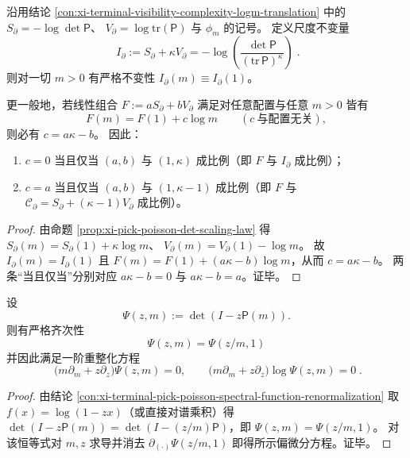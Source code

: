 \begin{conclusion}[尺度不变量与平移型势的规范唯一性]\label{con:xi-terminal-pick-poisson-scale-invariant-and-affine-uniqueness}
沿用结论 \ref{con:xi-terminal-visibility-complexity-logm-translation} 中的
\(
S_{\partial}=-\log\det\mathsf P
\)、
\(
V_{\partial}=\log\mathrm{tr}(\mathsf P)
\)
与 \(\phi_m\) 的记号。
定义尺度不变量
\[
\boxed{\;
I_{\partial}:=S_{\partial}+\kappa V_{\partial}
=-\log\!\left(\frac{\det\mathsf P}{(\mathrm{tr}\,\mathsf P)^{\kappa}}\right)\; } .
\]
则对一切 \(m>0\) 有严格不变性 \(I_{\partial}(m)\equiv I_{\partial}(1)\)。
\par
更一般地，若线性组合 \(F:=aS_{\partial}+bV_{\partial}\) 满足对任意配置与任意 \(m>0\) 皆有
\[
F(m)=F(1)+c\log m\qquad(c\ \text{与配置无关}),
\]
则必有 \(c=a\kappa-b\)。
因此：
\begin{enumerate}
  \item \(c=0\) 当且仅当 \((a,b)\) 与 \((1,\kappa)\) 成比例（即 \(F\) 与 \(I_{\partial}\) 成比例）；
  \item \(c=a\) 当且仅当 \((a,b)\) 与 \((1,\kappa-1)\) 成比例（即 \(F\) 与 \(\mathscr C_{\partial}=S_{\partial}+(\kappa-1)V_{\partial}\) 成比例）。
\end{enumerate}
\end{conclusion}
\begin{proof}
由命题 \ref{prop:xi-pick-poisson-det-scaling-law} 得
\(
S_{\partial}(m)=S_{\partial}(1)+\kappa\log m
\)、
\(
V_{\partial}(m)=V_{\partial}(1)-\log m
\)。
故
\(
I_{\partial}(m)=I_{\partial}(1)
\)
且
\(
F(m)=F(1)+(a\kappa-b)\log m
\)，从而 \(c=a\kappa-b\)。
两条“当且仅当”分别对应 \(a\kappa-b=0\) 与 \(a\kappa-b=a\)。证毕。
\end{proof}

\begin{conclusion}[特征行列式的齐次性与一阶重整化方程]\label{con:xi-terminal-pick-poisson-characteristic-homogeneity-pde}
设
\[
\Psi(z,m):=\det(I-z\mathsf P(m)).
\]
则有严格齐次性
\[
\boxed{\;\Psi(z,m)=\Psi(z/m,1)\;}
\]
并因此满足一阶重整化方程
\[
\boxed{\;
\bigl(m\partial_m+z\partial_z\bigr)\Psi(z,m)=0,\qquad
\bigl(m\partial_m+z\partial_z\bigr)\log\Psi(z,m)=0\; } .
\]
\end{conclusion}
\begin{proof}
由结论 \ref{con:xi-terminal-pick-poisson-spectral-function-renormalization} 取 \(f(x)=\log(1-zx)\)（或直接对谱乘积）得
\(
\det(I-z\mathsf P(m))=\det(I-(z/m)\mathsf P)
\)，即 \(\Psi(z,m)=\Psi(z/m,1)\)。
对该恒等式对 \(m,z\) 求导并消去 \(\partial_{(\cdot)}\Psi(z/m,1)\) 即得所示偏微分方程。证毕。
\end{proof}

